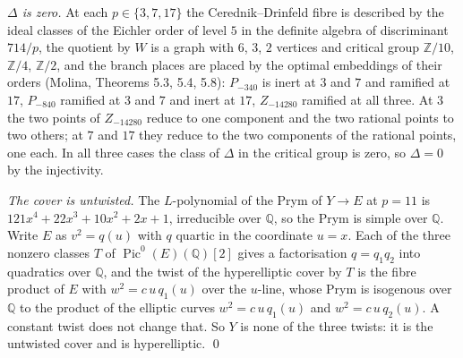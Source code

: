 \documentclass[11pt,reqno]{amsart}
\theoremstyle{plain}
\theoremstyle{definition}
\DeclareMathOperator{\Pic}{Pic}
\newcommand{\Q}{\mathbb{Q}}
\newcommand{\Z}{\mathbb{Z}}
\begin{document}
\emph{$\Delta$ is zero.} At each $p\in\{3,7,17\}$ the Cerednik--Drinfeld fibre is described by the ideal classes
of the Eichler order of level $5$ in the definite algebra of discriminant $714/p$, the quotient by $W$ is a graph
with $6$, $3$, $2$ vertices and critical group $\Z/10$, $\Z/4$, $\Z/2$, and the branch places are placed by the
optimal embeddings of their orders (Molina, Theorems 5.3, 5.4, 5.8): $P_{-340}$ is inert at $3$ and $7$ and
ramified at $17$, $P_{-840}$ ramified at $3$ and $7$ and inert at $17$, $Z_{-14280}$ ramified at all three. At $3$
the two points of $Z_{-14280}$ reduce to one component and the two rational points to two others; at $7$ and $17$
they reduce to the two components of the rational points, one each. In all three cases the class of $\Delta$ in
the critical group is zero, so $\Delta=0$ by the injectivity.

\emph{The cover is untwisted.} The $L$-polynomial of the Prym of $Y\to E$ at $p=11$ is
$121x^4+22x^3+10x^2+2x+1$, irreducible over $\Q$, so the Prym is simple over $\Q$. Write $E$ as
$v^2=q(u)$ with $q$ quartic in the coordinate $u=x$. Each of the three nonzero classes $T$ of
$\Pic^0(E)(\Q)[2]$ gives a factorisation $q=q_1q_2$ into quadratics over $\Q$, and the twist of the
hyperelliptic cover by $T$ is the fibre product of $E$ with $w^2=c\,u\,q_1(u)$ over the $u$-line, whose Prym is
isogenous over $\Q$ to the product of the elliptic curves $w^2=c\,u\,q_1(u)$ and $w^2=c\,u\,q_2(u)$. A constant
twist does not change that. So $Y$ is none of the three twists: it is the untwisted cover and is
hyperelliptic. \qed
\end{document}
